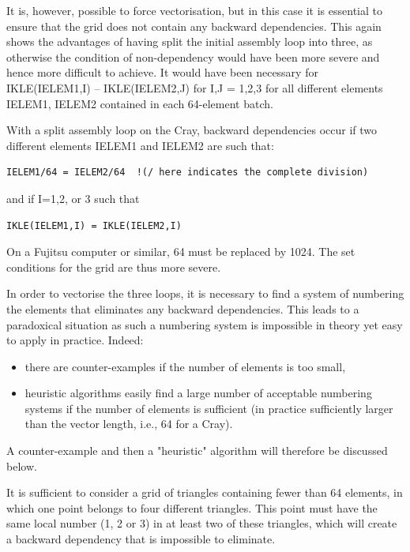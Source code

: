 It is, however, possible to force vectorisation, but in this case it is
essential to ensure that the grid does not contain any backward dependencies.
This again shows the advantages of having split the initial assembly loop into
three, as otherwise the condition of non-dependency would have been more severe
and hence more difficult to achieve. It would have been necessary for
IKLE(IELEM1,I) -- IKLE(IELEM2,J) for I,J = 1,2,3 for all different elements
IELEM1, IELEM2 contained in each 64-element batch.

With a split assembly loop on the Cray, backward dependencies occur if two
different elements IELEM1 and IELEM2 are such that:

\begin{lstlisting}[language=TelFortran]
IELEM1/64 = IELEM2/64  !(/ here indicates the complete division)
\end{lstlisting}

and if I=1,2, or 3 such that

\begin{lstlisting}[language=TelFortran]
IKLE(IELEM1,I) = IKLE(IELEM2,I)
\end{lstlisting}

On a Fujitsu computer or similar, 64 must be replaced by 1024. The set
conditions for the grid are thus more severe.

In order to vectorise the three loops, it is necessary to find a system of
numbering the elements that eliminates any backward dependencies. This leads to
a paradoxical situation as such a numbering system is impossible in theory yet
easy to apply in practice. Indeed:
\begin{itemize}
  \item there are counter-examples if the number of elements is too small,
  \item heuristic algorithms easily find a large number of acceptable numbering
    systems if the number of elements is sufficient (in practice sufficiently
    larger than the vector length, i.e., 64 for a Cray).
\end{itemize}

A counter-example and then a "heuristic" algorithm will therefore be discussed
below.


It is sufficient to consider a grid of triangles containing fewer than 64
elements, in which one point belongs to four different triangles. This point
must have the same local number (1, 2 or 3) in at least two of these triangles,
which will create a backward dependency that is impossible to eliminate.

